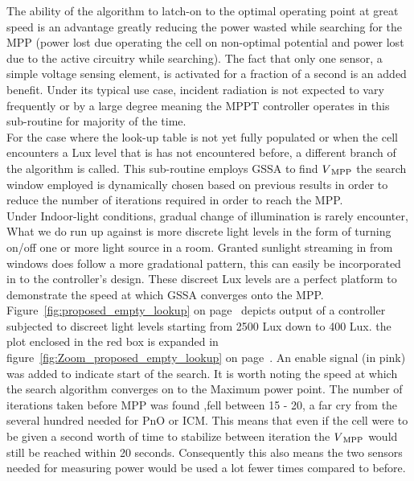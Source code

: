 The ability of the algorithm to latch-on to the optimal operating point at great speed is an advantage greatly reducing the power wasted while searching for the \ac{MPP} (power lost due operating the cell on non-optimal potential and power lost due to the active circuitry while searching). The fact that only one sensor, a simple voltage sensing element, is activated for a fraction of a second is an added benefit. Under its typical use case, incident radiation is not expected to vary frequently or by a large degree meaning the \ac{MPPT} controller operates in this sub-routine for majority of the time.\\

For the case where the look-up table is not yet fully populated or when the cell encounters a Lux level that is has not encountered before, a different branch of the algorithm is called. This sub-routine employs \ac{GSSA} to find $V\textsubscript{MPP}$ the search window employed is dynamically  chosen based on previous results in order to reduce the number of iterations required in order to reach the \ac{MPP}.\\

Under Indoor-light conditions, gradual change of illumination is rarely encounter, What we do run up against is more discrete light levels in the form of turning on/off one or more light source in a room. Granted sunlight streaming in from windows does follow a more gradational pattern, this can easily be incorporated in to the controller's design. These discreet Lux levels are a perfect platform to demonstrate the speed at which \ac{GSSA} converges onto the \ac{MPP}.\\

Figure~\ref{fig:proposed_empty_lookup} on page~\pageref{fig:proposed_empty_lookup} depicts output of a controller subjected to discreet light levels starting from 2500 Lux down to 400 Lux. the plot enclosed in the red box is expanded in figure~\ref{fig:Zoom_proposed_empty_lookup} on page~\pageref{fig:Zoom_proposed_empty_lookup}. An enable signal (in pink) was added to indicate start of the search. It is worth noting the speed at which the search algorithm converges on to the Maximum power point. The number of iterations taken before \ac{MPP} was found ,fell between 15 - 20, a far cry from the several hundred needed for \ac{PnO} or \ac{ICM}. This means that even if the cell were to be given a second worth of time to stabilize between iteration the $V\textsubscript{MPP}$ would still be reached within 20 seconds. Consequently this also means the two sensors needed for measuring power would be used a lot fewer times compared to before. \\
       

